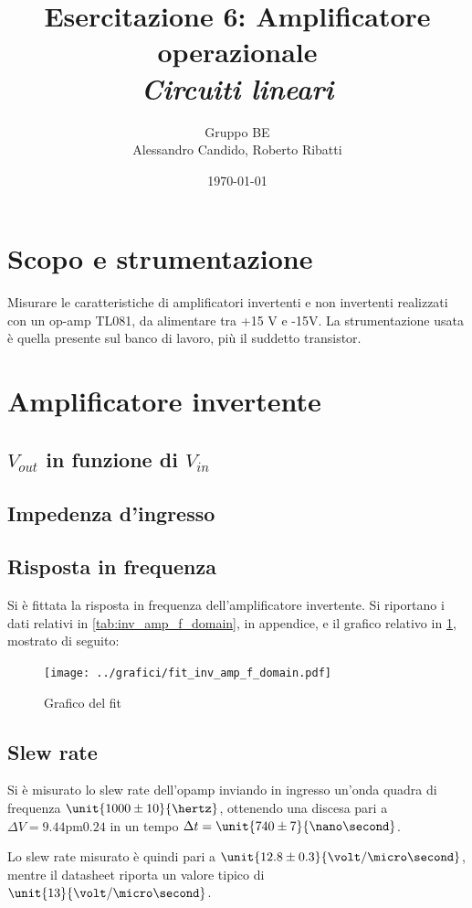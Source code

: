 \documentclass[10pt,a4paper]{article}
\title{Esercitazione 6: Amplificatore operazionale\\ \Large{\emph{Circuiti lineari}}}
\author{Gruppo BE \\ Alessandro Candido, Roberto Ribatti}
\date{\today}
\begin{document}
\maketitle

\section{Scopo e strumentazione}
Misurare le caratteristiche di amplificatori invertenti e non invertenti realizzati con un op-amp TL081, da alimentare tra +15 V e -15V.
La strumentazione usata è quella presente sul banco di lavoro, più il suddetto transistor.

\section{Amplificatore invertente}

\subsection{$V_{out}$ in funzione di $V_{in}$}

\subsection{Impedenza d'ingresso}

\subsection{Risposta in frequenza}
Si è fittata la risposta in frequenza dell'amplificatore invertente. Si riportano i dati relativi in \tablename{\ref{tab:inv_amp_f_domain}}, in appendice, e il grafico relativo in \figurename{\ref{fig:invamp}}, mostrato di seguito:

\begin{figure}[h!]
	\centering
	\texttt{[image: ../grafici/fit\_inv\_amp\_f\_domain.pdf]}
	\caption{Grafico del fit }
	\label{fig:invamp}
\end{figure}

\subsection{Slew rate}
Si è misurato lo slew rate dell'opamp inviando in ingresso un'onda quadra di frequenza $\unit{1000 \pm 10}{\hertz}$, ottenendo una discesa pari a  $\Delta V = \unit{9.44 \pm 0.24}$ in un tempo $\Delta t = \unit{740 \pm 7}{\nano\second}$.

Lo slew rate misurato è quindi pari a $\unit{12.8 \pm 0.3}{\volt/\micro\second}$, mentre il datasheet riporta un valore tipico di $\unit{13}{\volt/\micro\second}$.
\end{document}
